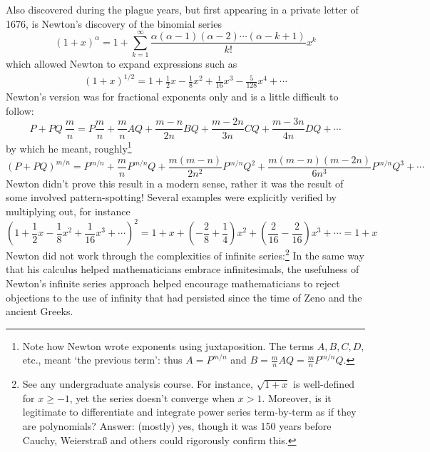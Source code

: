 
Also discovered during the plague years, but first appearing in a private letter of 1676, is Newton's discovery of the binomial series
\[(1+x)^\alpha=1+\sum_{k=1}^\infty\frac{\alpha(\alpha-1)(\alpha-2)\cdots(\alpha-k+1)}{k!}x^k\]
which allowed Newton to expand expressions such as
\begin{align*}
(1+x)^{1/2} = 1+\frac 12x-\frac{1}{8}x^2 +\frac{1}{16}x^3 -\frac{5}{128}x^4 +\cdots
\end{align*}
Newton's version was for fractional exponents only and is a little difficult to follow:
\[P+PQ\ \frac mn=P\frac mn+\frac mnAQ+\frac{m-n}{2n}BQ+\frac{m-2n}{3n}CQ+\frac{m-3n}{4n}DQ+\cdots\]
by which he meant, roughly\footnote{Note how Newton wrote exponents using juxtaposition. The terms $A,B,C,D$, etc., meant `the previous term': thus $A=P^{m/n}$ and $B=\frac mnAQ=\frac mnP^{m/n}Q$.}
\[(P+PQ)^{m/n}=P^{m/n}+\frac mn P^{m/n}Q +\frac{m(m-n)}{2n^2}P^{m/n}Q^2 +\frac{m(m-n)(m-2n)}{6n^3}P^{m/n}Q^3+\cdots\]
Newton didn't prove this result in a modern sense, rather it was the result of some involved pattern-spotting! Several examples were explicitly  verified by multiplying out, for instance
\[\left(1+\frac 12x-\frac{1}{8}x^2 +\frac{1}{16}x^3 +\cdots\right)^2 =1+x+\left(-\frac 28+\frac 14\right)x^2+\left(\frac 2{16}-\frac 2{16}\right)x^3 +\cdots =1+x\]
Newton did not work through the complexities of infinite series:\footnote{See any undergraduate analysis course. For instance, $\sqrt{1+x}$ is well-defined for $x\ge -1$, yet the series doesn't converge when $x>1$. Moreover, is it legitimate to differentiate and integrate power series term-by-term as if they are polynomials? Answer: (mostly) yes, though it was 150 years before Cauchy, Weierstraß and others could rigorously confirm this.}
In the same way that his calculus helped mathematicians embrace infinitesimals, the usefulness of Newton's infinite series approach helped encourage mathematicians to reject objections to the use of infinity that had persisted since the time of Zeno and the ancient Greeks. \medbreak


